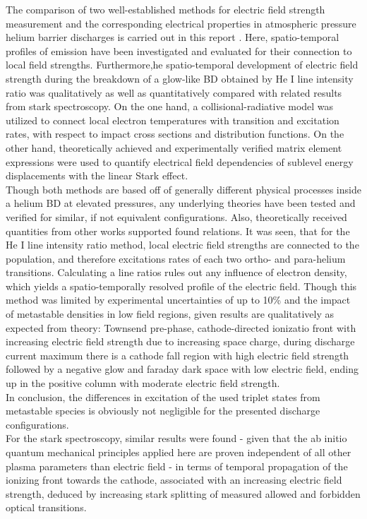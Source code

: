 \documentclass[a4paper,10pt,twoside]{article}
\begin{document}
		The comparison of two well-established methods for electric field strength measurement and the corresponding electrical properties in atmospheric pressure helium barrier discharges is carried out in this report . Here, spatio-temporal profiles of emission have been investigated and evaluated for their connection to local field strengths. Furthermore,he spatio-temporal development of electric field strength during the breakdown of a glow-like BD obtained by He I line intensity ratio was qualitatively as well as quantitatively compared with related results from stark spectroscopy. On the one hand, a collisional-radiative model was utilized to connect local electron temperatures with transition and excitation rates, with respect to impact cross sections and distribution functions. On the other hand, theoretically achieved and experimentally verified matrix element expressions were used to quantify electrical field dependencies of sublevel energy displacements with the linear Stark effect.\\
		Though both methods are based off of generally different physical processes inside a helium BD at elevated pressures, any underlying theories have been tested and verified for similar, if not equivalent configurations. Also, theoretically received quantities from other works supported found relations. It was seen, that for the He I line intensity ratio method, local electric field strengths are connected to the population, and therefore excitations rates of each two ortho- and para-helium transitions. Calculating a line ratios rules out any influence of electron density, which yields a spatio-temporally resolved profile of the electric field. Though this method was limited by experimental uncertainties of up to 10\% and the impact of metastable densities in low field regions, given results are qualitatively as expected from theory: Townsend pre-phase, cathode-directed ionizatio front with increasing electric field strength due to increasing space charge, during discharge current maximum there is a cathode fall region with high electric field strength followed by a negative glow and faraday dark space with low electric field, ending up in the positive column with moderate electric field strength.\\
		In conclusion, the differences in excitation of the used triplet states from metastable species is obviously not negligible for the presented discharge configurations.\\
		For the stark spectroscopy, similar results were found - given that the ab initio quantum mechanical principles applied here are proven independent of all other plasma parameters than electric field - in terms of temporal propagation of the ionizing front towards the cathode, associated with an increasing electric field strength, deduced by increasing stark splitting of measured allowed and forbidden optical transitions.\\
\end{document}

